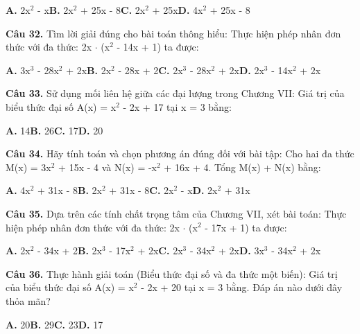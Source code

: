 \documentclass[11pt,a4paper]{article}
\begin{document}
\hspace*{1.5em}\textbf{A.} 2x$^2$ - x\quad\quad \textbf{B.} 2x$^2$ + 25x - 8\quad\quad \textbf{C.} 2x$^2$ + 25x\quad\quad \textbf{D.} 4x$^2$ + 25x - 8\par\vspace{2pt}
\textbf{\color{primary} Câu 32.} Tìm lời giải đúng cho bài toán thông hiểu: Thực hiện phép nhân đơn thức với đa thức: 2x $\cdot$ (x$^2$ - 14x + 1) ta được:\par
\hspace*{1.5em}\textbf{A.} 3x$^3$ - 28x$^2$ + 2x\quad\quad \textbf{B.} 2x$^2$ - 28x + 2\quad\quad \textbf{C.} 2x$^3$ - 28x$^2$ + 2x\quad\quad \textbf{D.} 2x$^3$ - 14x$^2$ + 2x\par\vspace{2pt}
\textbf{\color{primary} Câu 33.} Sử dụng mối liên hệ giữa các đại lượng trong Chương VII: Giá trị của biểu thức đại số A(x) = x$^2$ - 2x + 17 tại x = 3 bằng:\par
\hspace*{1.5em}\textbf{A.} 14\quad\quad \textbf{B.} 26\quad\quad \textbf{C.} 17\quad\quad \textbf{D.} 20\par\vspace{2pt}
\textbf{\color{primary} Câu 34.} Hãy tính toán và chọn phương án đúng đối với bài tập: Cho hai đa thức M(x) = 3x$^2$ + 15x - 4 và N(x) = -x$^2$ + 16x + 4. Tổng M(x) + N(x) bằng:\par
\hspace*{1.5em}\textbf{A.} 4x$^2$ + 31x - 8\quad\quad \textbf{B.} 2x$^2$ + 31x - 8\quad\quad \textbf{C.} 2x$^2$ - x\quad\quad \textbf{D.} 2x$^2$ + 31x\par\vspace{2pt}
\textbf{\color{primary} Câu 35.} Dựa trên các tính chất trọng tâm của Chương VII, xét bài toán: Thực hiện phép nhân đơn thức với đa thức: 2x $\cdot$ (x$^2$ - 17x + 1) ta được:\par
\hspace*{1.5em}\textbf{A.} 2x$^2$ - 34x + 2\quad\quad \textbf{B.} 2x$^3$ - 17x$^2$ + 2x\quad\quad \textbf{C.} 2x$^3$ - 34x$^2$ + 2x\quad\quad \textbf{D.} 3x$^3$ - 34x$^2$ + 2x\par\vspace{2pt}
\textbf{\color{primary} Câu 36.} Thực hành giải toán (Biểu thức đại số và đa thức một biến): Giá trị của biểu thức đại số A(x) = x$^2$ - 2x + 20 tại x = 3 bằng. Đáp án nào dưới đây thỏa mãn?\par
\hspace*{1.5em}\textbf{A.} 20\quad\quad \textbf{B.} 29\quad\quad \textbf{C.} 23\quad\quad \textbf{D.} 17\par\vspace{2pt}
\end{document}
